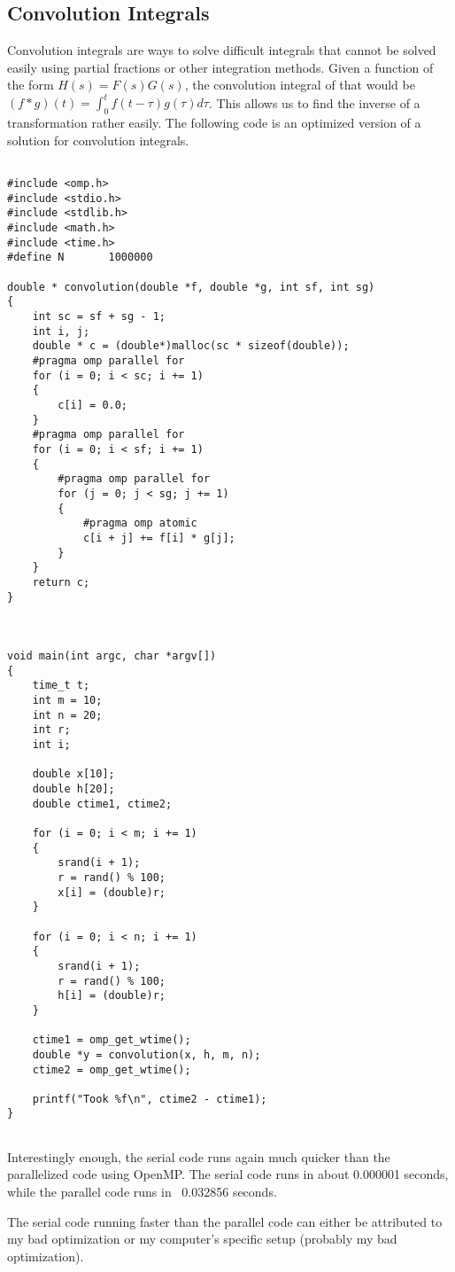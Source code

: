 \documentclass{article}
\begin{document}
\subsection{Convolution Integrals}
Convolution integrals are ways to solve difficult integrals that cannot be solved easily using partial fractions or other integration methods. Given a function of the form $ H(s) = F(s)G(s) $, the convolution integral of that would be $ (f*g)(t) = \int_{0}^{t}f(t-\tau)g(\tau)d\tau $. This allows us to find the inverse of a transformation rather easily. The following code is an optimized version of a solution for convolution integrals.

\begin{verbatim}

#include <omp.h>
#include <stdio.h>
#include <stdlib.h>
#include <math.h>
#include <time.h>
#define N       1000000

double * convolution(double *f, double *g, int sf, int sg)
{
	int sc = sf + sg - 1;
	int i, j;
	double * c = (double*)malloc(sc * sizeof(double));
	#pragma omp parallel for
	for (i = 0; i < sc; i += 1)
	{
		c[i] = 0.0;
	}
	#pragma omp parallel for
	for (i = 0; i < sf; i += 1)
	{
		#pragma omp parallel for
		for (j = 0; j < sg; j += 1)
		{
			#pragma omp atomic
			c[i + j] += f[i] * g[j];
		}
	}
	return c;
}



void main(int argc, char *argv[])
{
	time_t t;
	int m = 10;
	int n = 20;
	int r;
	int i;

	double x[10];
	double h[20];
	double ctime1, ctime2;

	for (i = 0; i < m; i += 1)
	{
		srand(i + 1);
		r = rand() % 100;
		x[i] = (double)r;
	}

	for (i = 0; i < n; i += 1)
	{
		srand(i + 1);
		r = rand() % 100;
		h[i] = (double)r;
	}

	ctime1 = omp_get_wtime();
	double *y = convolution(x, h, m, n);
	ctime2 = omp_get_wtime();

	printf("Took %f\n", ctime2 - ctime1);
}


\end{verbatim}
Interestingly enough, the serial code runs again much quicker than the parallelized code using OpenMP. The serial code runs in about 0.000001 seconds, while the parallel code runs in ~0.032856 seconds.

The serial code running faster than the parallel code can either be attributed to my bad optimization or my computer's specific setup (probably my bad optimization).
\end{document}
